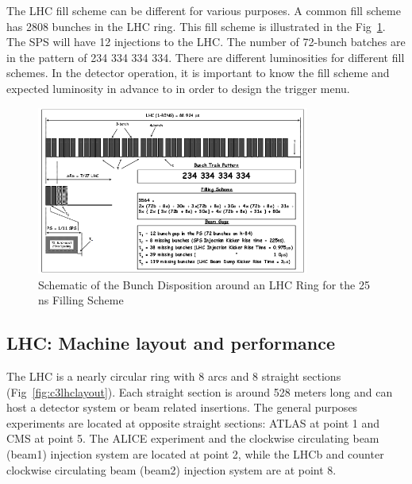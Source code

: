 The LHC fill scheme can be different for various purposes. A common fill scheme has 2808 bunches in the LHC ring. This fill scheme is illustrated in the Fig~\ref{fig:c3lhcfillscheme}. The SPS will have 12 injections to the LHC. The number of 72-bunch batches are in the pattern of 234 334 334 334. There are different luminosities for different fill schemes. In the detector operation, it is important to know the fill scheme and expected luminosity in advance to in order to design the trigger menu. 

\begin{figure}[htbp]
 \begin{center}
  \includegraphics[width=0.8\textwidth]{figures/c3/c3_lhc_fillscheme.png}
 \end{center}
 \caption{Schematic of the Bunch Disposition around an LHC Ring for the 25 ns Filling Scheme}
 \label{fig:c3lhcfillscheme}
\end{figure}

\clearpage
\subsection{LHC: Machine layout and performance}

The LHC is a nearly circular ring with 8 arcs and 8 straight sections (Fig~\ref{fig:c3lhclayout}). Each straight section is around 528 meters long and can host a detector system or beam related insertions. The general purposes experiments are located at opposite straight sections: ATLAS at point 1 and CMS at point 5. The ALICE experiment and the clockwise circulating beam (beam1) injection system are located at point 2, while the LHCb and counter clockwise circulating beam (beam2) injection system are at point 8. 

